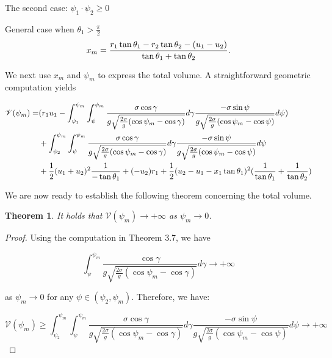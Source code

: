 \documentclass[letterpaper,reqno,10pt,twoside]{amsart}
\newtheorem{theorem}{Theorem}[section]
\theoremstyle{definition}
\theoremstyle{remark}
\begin{document}
\begin{section}{The second case: $\psi_1\cdot \psi_2\geq 0$ }
\begin{subsection}{General case when $\theta_1>\frac{\pi}{2}$}
            \begin{equation}{\label{equ:3.1.44}}
                x_m=\frac{r_1\tan\theta_1-r_2\tan\theta_2-(u_1-u_2)}{\tan\theta_1+\tan\theta_2}.
            \end{equation}

            \noindent We next use $x_m$ and $\psi_m$ to express the total volume. A straightforward geometric computation yields

            \begin{align}
                 \mathscr{V}(\psi_{m})=&(r_1u_1-\int_{\psi_1}^{\psi_m}\int_{\psi}^{\psi_m}\frac{\sigma\cos\gamma}{g\sqrt{\frac{2\sigma}{g}(\cos\psi_m-\cos\gamma)}}d\gamma \frac{-\sigma\sin\psi}{g\sqrt{\frac{2\sigma}{g}(\cos\psi_m-\cos\psi)}}d\psi) \notag\\
                 &+\int_{\psi_2}^{\psi_m}\int_{\psi}^{\psi_m}\frac{\sigma\cos\gamma}{g\sqrt{\frac{2\sigma}{g}(\cos\psi_m-\cos\gamma)}}d\gamma \frac{-\sigma\sin\psi}{g\sqrt{\frac{2\sigma}{g}(\cos\psi_m-\cos\psi)}}d\psi \notag\\
                 &+\frac{1}{2}(u_1+u_2)^{2}\frac{1}{-\tan\theta_1}+(-u_2)r_1+\frac{1}{2}(u_2-u_1-x_1\tan\theta_1)^{2}(\frac{1}{\tan\theta_1}+\frac{1}{\tan\theta_2}) \label{equ:3.1.45}
            \end{align}


            We are now ready to establish the following theorem concerning the total volume.

            \begin{theorem}

                It holds that ${\mathscr{V}}(\psi_m)\rightarrow +\infty$ as $\psi_m\rightarrow 0$.
            \end{theorem}

            \begin{proof}

                 Using the computation in Theorem 3.7, we have

                \begin{equation*}
                    \int_{\psi}^{\psi_m} \frac{\cos\gamma}{g\sqrt{\frac{2\sigma}{g}(\cos\psi_m-\cos\gamma)}}d\gamma \rightarrow +\infty
                \end{equation*}

                \noindent as $\psi_m\rightarrow 0$ for any $\psi\in (\psi_2,\psi_m)$. Therefore, we have:

                \begin{equation*}
                \mathscr{V}(\psi_m)\geq \int_{\psi_2}^{\psi_m}\int_{\psi}^{\psi_m}\frac{\sigma\cos\gamma}{g\sqrt{\frac{2\sigma}{g}(\cos\psi_m-\cos\gamma)}}d\gamma \frac{-\sigma\sin\psi}{g\sqrt{\frac{2\sigma}{g}(\cos\psi_m-\cos\psi)}}d\psi\rightarrow +\infty
                \end{equation*}


\end{proof}
\end{subsection}
\end{section}
\end{document}
